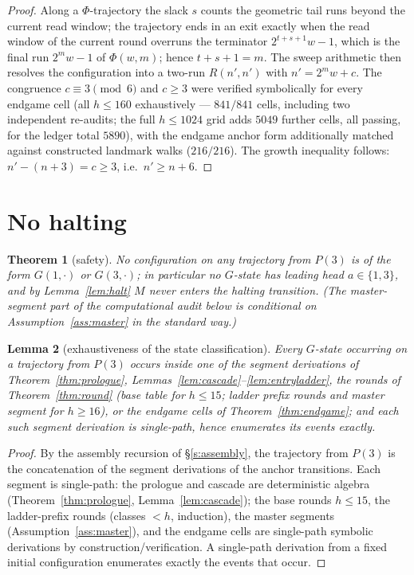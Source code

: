\documentclass[11pt]{amsart}
\newtheorem{theorem}{Theorem}[section]
\newtheorem{lemma}[theorem]{Lemma}
\theoremstyle{definition}
\begin{document}
\begin{proof}
Along a $\Phi$-trajectory the slack $s$ counts the geometric tail runs
beyond the current read window; the trajectory ends in an exit exactly
when the read window of the current round overruns the terminator
$2^{t+s+1}w-1$, which is the final run $2^{m}w-1$ of $\Phi(w,m)$; hence
$t+s+1=m$. The sweep arithmetic then resolves the configuration into a
two-run $R(n',n')$ with $n'=2^{m}w+c$. The congruence $c\equiv3\pmod6$
and $c\ge3$ were verified symbolically for every endgame cell (all
$h\le160$ exhaustively --- $841/841$ cells, including two independent
re-audits; the full $h\le1024$ grid adds $5049$ further cells, all passing,
for the ledger total $5890$), with the endgame anchor form additionally
matched against constructed landmark walks ($216/216$). The growth inequality follows:
$n'-(n+3)=c\ge3$, i.e.\ $n'\ge n+6$.
\end{proof}

\section{No halting}\label{s:safety}

\begin{theorem}[safety]\label{thm:safety}
No configuration on any trajectory from $P(3)$ is of the form
$G(1,\cdot)$ or $G(3,\cdot)$; in particular no $G$-state has leading head
$a\in\{1,3\}$, and by Lemma~\ref{lem:halt} $M$ never enters the halting
transition. (The master-segment part of the computational audit below is
conditional on Assumption~\ref{ass:master} in the standard way.)
\end{theorem}

\begin{lemma}[exhaustiveness of the state classification]\label{lem:exhaust}
Every $G$-state occurring on a trajectory from $P(3)$ occurs inside one of
the segment derivations of Theorem~\ref{thm:prologue},
Lemmas~\ref{lem:cascade}--\ref{lem:entryladder}, the rounds of
Theorem~\ref{thm:round} (base table for $h\le15$; ladder prefix rounds and
master segment for $h\ge16$), or the endgame cells of
Theorem~\ref{thm:endgame}; and each such segment derivation is single-path,
hence enumerates its events exactly.
\end{lemma}

\begin{proof}
By the assembly recursion of \S\ref{s:assembly}, the trajectory from $P(3)$
is the concatenation of the segment derivations of the anchor transitions.
Each segment is single-path: the prologue and cascade are deterministic
algebra (Theorem~\ref{thm:prologue}, Lemma~\ref{lem:cascade}); the base
rounds $h\le15$, the ladder-prefix rounds (classes $<h$, induction), the
master segments (Assumption~\ref{ass:master}), and the endgame cells are
single-path symbolic derivations by construction/verification. A
single-path derivation from a fixed initial configuration enumerates
exactly the events that occur.
\end{proof}
\end{document}
